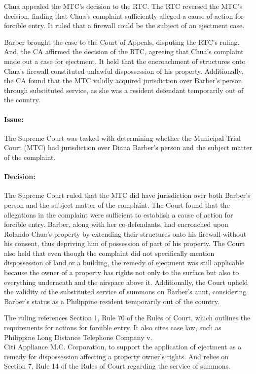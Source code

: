 \documentclass[
12pt,
oneside,
onehalfspacing,
headsepline
]{DigestCollection}
\begin{document}
Chua appealed the MTC's decision to the RTC. The RTC reversed the MTC's decision, finding that Chua's complaint sufficiently alleged a cause of action for forcible entry. It ruled that a firewall could be the subject of an ejectment case.

Barber brought the case to the Court of Appeals, disputing the RTC's ruling. And, the CA affirmed the decision of the RTC, agreeing that Chua's complaint made out a case for ejectment. It held that the encroachment of structures onto Chua's firewall constituted unlawful dispossession of his property. Additionally, the CA found that the MTC validly acquired jurisdiction over Barber's person through substituted service, as she was a resident defendant temporarily out of the country.

\paragraph{Issue:}
\label{8bdda7b0-09fd-11ef-932c-63c852f65e48}


The Supreme Court was tasked with determining whether the Municipal Trial Court (MTC) had jurisdiction over Diana Barber's person and the subject matter of the complaint.

\paragraph{Decision:}
\label{8d78ba10-09fd-11ef-932c-63c852f65e48}


The Supreme Court ruled that the MTC did have jurisdiction over both Barber's person and the subject matter of the complaint. The Court found that the allegations in the complaint were sufficient to establish a cause of action for forcible entry. Barber, along with her co-defendants, had encroached upon Rolando Chua's property by extending their structures onto his firewall without his consent, thus depriving him of possession of part of his property. The Court also held that even though the complaint did not specifically mention dispossession of land or a building, the remedy of ejectment was still applicable because the owner of a property has rights not only to the surface but also to everything underneath and the airspace above it. Additionally, the Court upheld the validity of the substituted service of summons on Barber's aunt, considering Barber's status as a Philippine resident temporarily out of the country.

The ruling references Section 1, Rule 70 of the Rules of Court, which outlines the requirements for actions for forcible entry. It also cites case law, such as Philippine Long Distance Telephone Company v. \\Citi Appliance M.C. Corporation, to support the application of ejectment as a remedy for dispossession affecting a property owner's rights. And relies on Section 7, Rule 14 of the Rules of Court regarding the service of summons.
\end{document}
